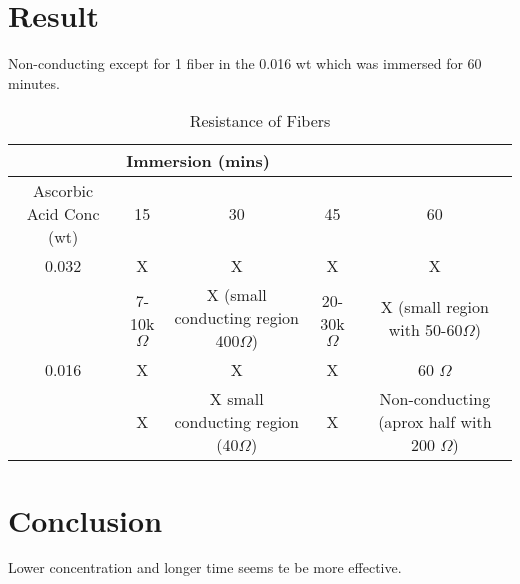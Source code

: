 \documentclass{article}
\begin{document}
\pagebreak
\section{Result}
Non-conducting except for 1 fiber in the 0.016 wt which was immersed for 60 minutes.
\begin{table}[h!]
\hskip-3.5cm\begin{tabular}{ |c|c|c|c|c| } 
 \hline
& \multicolumn{4}{l|}{Immersion (mins)} \\ \hline
Ascorbic Acid Conc (wt) & 15 & 30 & 45 & 60 \\ 
 \hline
 0.032  & X & X & X & X \\ 
 & 7-10k$\Omega$ & X  (small conducting region 400$\Omega$) & 20-30k$\Omega$ & X (small region with 50-60$\Omega$) \\ 
 \hline
 0.016 & X & X & X & 60 $\Omega$\\ 
& X & X small conducting region (40$\Omega$) & X & Non-conducting (aprox half with 200 $\Omega$) \\ 
 \hline
\end{tabular}
 \caption{Resistance of Fibers}
\label{table:1}
\end{table}

\section{Conclusion}

Lower concentration and longer time seems te be more effective.
\end{document}
